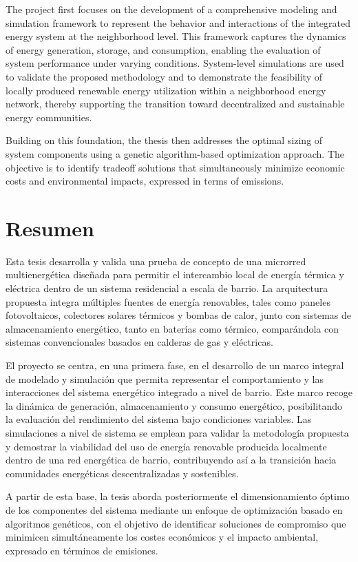 \documentclass[12pt,a4paper]{report}
\begin{document}
The project first focuses on the development of a comprehensive modeling and simulation framework to represent the behavior and interactions of the integrated energy system at the neighborhood level. This framework captures the dynamics of energy generation, storage, and consumption, enabling the evaluation of system performance under varying conditions. System-level simulations are used to validate the proposed methodology and to demonstrate the feasibility of locally produced renewable energy utilization within a neighborhood energy network, thereby supporting the transition toward decentralized and sustainable energy communities.

Building on this foundation, the thesis then addresses the optimal sizing of system components using a genetic algorithm-based optimization approach. The objective is to identify tradeoff solutions that simultaneously minimize economic costs and environmental impacts, expressed in terms of emissions.

\chapter*{Resumen}
\noindent Esta tesis desarrolla y valida una prueba de concepto de una microrred multienergética diseñada para permitir el intercambio local de energía térmica y eléctrica dentro de un sistema residencial a escala de barrio. La arquitectura propuesta integra múltiples fuentes de energía renovables, tales como paneles fotovoltaicos, colectores solares térmicos y bombas de calor, junto con sistemas de almacenamiento energético, tanto en baterías como térmico, comparándola con sistemas convencionales basados en calderas de gas y eléctricas.

El proyecto se centra, en una primera fase, en el desarrollo de un marco integral de modelado y simulación que permita representar el comportamiento y las interacciones del sistema energético integrado a nivel de barrio. Este marco recoge la dinámica de generación, almacenamiento y consumo energético, posibilitando la evaluación del rendimiento del sistema bajo condiciones variables. Las simulaciones a nivel de sistema se emplean para validar la metodología propuesta y demostrar la viabilidad del uso de energía renovable producida localmente dentro de una red energética de barrio, contribuyendo así a la transición hacia comunidades energéticas descentralizadas y sostenibles.

A partir de esta base, la tesis aborda posteriormente el dimensionamiento óptimo de los componentes del sistema mediante un enfoque de optimización basado en algoritmos genéticos, con el objetivo de identificar soluciones de compromiso que minimicen simultáneamente los costes económicos y el impacto ambiental, expresado en términos de emisiones.
\end{document}
